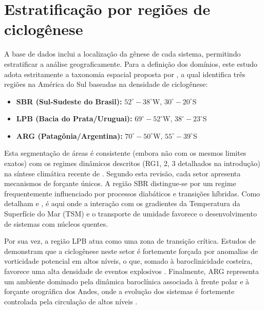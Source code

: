 \section{Estratificação por regiões de ciclogênese}\label{sec:regiones_ciclogenesis}
A base de dados inclui a localização da gênese de cada sistema, permitindo estratificar a análise geograficamente. Para a definição dos domínios, este estudo adota estritamente a taxonomia espacial proposta por \citet{gramcianinov2019properties}, a qual identifica três regiões na América do Sul baseadas na densidade de ciclogênese:

\begin{itemize}
    \item \textbf{SBR (Sul-Sudeste do Brasil):} $52^\circ-38^\circ$W, $30^\circ-20^\circ$S
    \item \textbf{LPB (Bacia do Prata/Uruguai):} $69^\circ-52^\circ$W, $38^\circ-23^\circ$S
    \item \textbf{ARG (Patagônia/Argentina):} $70^\circ-50^\circ$W, $55^\circ-39^\circ$S
\end{itemize}

Esta segmentação de áreas é consistente (embora não com os mesmos limites exatos) com os regimes dinâmicos descritos (RG1, 2, 3 detalhados na introdução) na síntese climática recente de \citet{reboita2026meteorology}. Segundo esta revisão, cada setor apresenta mecanismos de forçante únicos. A região SBR distingue-se por um regime frequentemente influenciado por processos diabáticos e transições híbridas. Como detalham \citet{marrafon2022classificacao} e \citet{reboita2022from}, é aqui onde a interação com os gradientes da Temperatura da Superfície do Mar (TSM) e o transporte de umidade favorece o desenvolvimento de sistemas com núcleos quentes. 

Por sua vez, a região LPB atua como uma zona de transição crítica. Estudos de \citet{crespo2020potential} demonstram que a ciclogênese neste setor é fortemente forçada por anomalias de vorticidade potencial em altos níveis, o que, somado à baroclinicidade costeira, favorece uma alta densidade de eventos explosivos \citep{andrade2024composite}. Finalmente, ARG representa um ambiente dominado pela dinâmica baroclínica associada à frente polar e à forçante orográfica dos Andes, onde a evolução dos sistemas é fortemente controlada pela circulação de altos níveis \citep{vera2002cold, inatsu2004zonal}.

